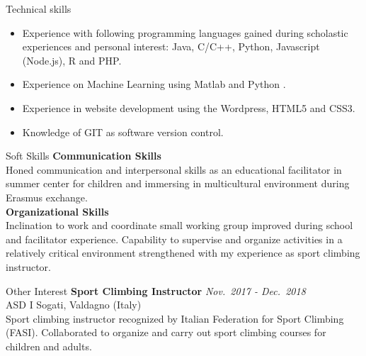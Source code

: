 \documentclass{resume} %
\begin{document}
\begin{rSection}{Technical skills}
    \begin{itemize}
        
        \item Experience with following programming languages gained during scholastic experiences and personal interest: Java, C/C++, Python, Javascript (Node.js), R and PHP.
        \item Experience on Machine Learning using Matlab and Python .
        \item Experience in website development using the Wordpress, HTML5 and CSS3.
        \item Knowledge of GIT as software version control.
    \end{itemize}    
\end{rSection}

\begin{rSection}{Soft Skills}
        {\bf Communication Skills}\\
        Honed communication and interpersonal skills as an educational facilitator in summer center for children and immersing in multicultural environment during Erasmus exchange. \\
        {\bf Organizational Skills}\\
        Inclination to work and coordinate small working group improved during school and facilitator experience.
        Capability to supervise and organize activities in a relatively critical environment strengthened with my experience as sport climbing instructor.
\end{rSection}

\begin{rSection}{Other Interest}
    {\bf Sport Climbing Instructor}
    \hfill {\em Nov.~2017 - Dec.~2018}\\
    ASD I Sogati, Valdagno (Italy) \\
    Sport climbing instructor recognized by Italian Federation for Sport Climbing (FASI). Collaborated to organize and carry out sport climbing courses for children and adults.
\end{rSection}
\end{document}
